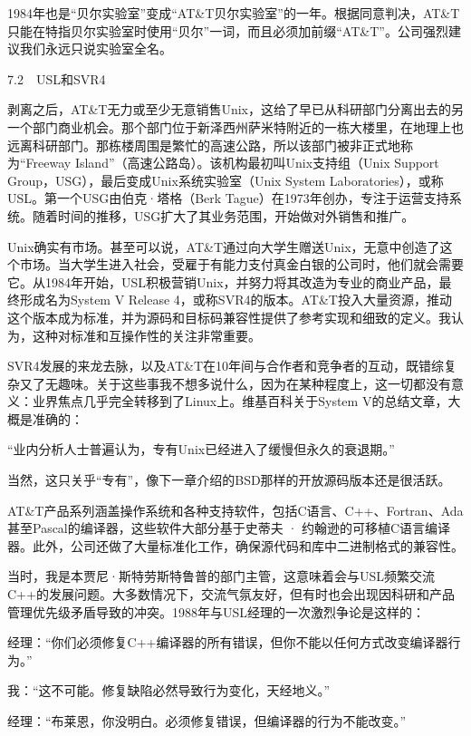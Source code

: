 \documentclass[a4paper,12pt,UTF8,twoside]{ctexbook}
\begin{document}
1984年也是“贝尔实验室”变成“AT\&T贝尔实验室”的一年。根据同意判决，AT\&T只能在特指贝尔实验室时使用“贝尔”一词，而且必须加前缀“AT\&T”。公司强烈建议我们永远只说实验室全名。





7.2　USL和SVR4


剥离之后，AT\&T无力或至少无意销售Unix，这给了早已从科研部门分离出去的另一个部门商业机会。那个部门位于新泽西州萨米特附近的一栋大楼里，在地理上也远离科研部门。那栋楼周围是繁忙的高速公路，所以该部门被非正式地称为“Freeway Island”（高速公路岛）。该机构最初叫Unix支持组（Unix Support Group，USG），最后变成Unix系统实验室（Unix System Laboratories），或称USL。第一个USG由伯克·塔格（Berk Tague）在1973年创办，专注于运营支持系统。随着时间的推移，USG扩大了其业务范围，开始做对外销售和推广。

Unix确实有市场。甚至可以说，AT\&T通过向大学生赠送Unix，无意中创造了这个市场。当大学生进入社会，受雇于有能力支付真金白银的公司时，他们就会需要它。从1984年开始，USL积极营销Unix，并努力将其改造为专业的商业产品，最终形成名为System V Release 4，或称SVR4的版本。AT\&T投入大量资源，推动这个版本成为标准，并为源码和目标码兼容性提供了参考实现和细致的定义。我认为，这种对标准和互操作性的关注非常重要。

SVR4发展的来龙去脉，以及AT\&T在10年间与合作者和竞争者的互动，既错综复杂又了无趣味。关于这些事我不想多说什么，因为在某种程度上，这一切都没有意义：业界焦点几乎完全转移到了Linux上。维基百科关于System V的总结文章，大概是准确的：

“业内分析人士普遍认为，专有Unix已经进入了缓慢但永久的衰退期。”



当然，这只关乎“专有”，像下一章介绍的BSD那样的开放源码版本还是很活跃。

AT\&T产品系列涵盖操作系统和各种支持软件，包括C语言、C++、Fortran、Ada甚至Pascal的编译器，这些软件大部分基于史蒂夫 · 约翰逊的可移植C语言编译器。此外，公司还做了大量标准化工作，确保源代码和库中二进制格式的兼容性。

当时，我是本贾尼·斯特劳斯特鲁普的部门主管，这意味着会与USL频繁交流C++的发展问题。大多数情况下，交流气氛友好，但有时也会出现因科研和产品管理优先级矛盾导致的冲突。1988年与USL经理的一次激烈争论是这样的：

经理：“你们必须修复C++编译器的所有错误，但你不能以任何方式改变编译器行为。”

我：“这不可能。修复缺陷必然导致行为变化，天经地义。”

经理：“布莱恩，你没明白。必须修复错误，但编译器的行为不能改变。”
\end{document}
